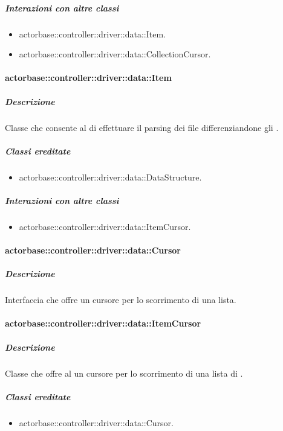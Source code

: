 \documentclass{scalatekids-article}
\begin{document}
\subparagraph{Interazioni con altre classi}

\begin{itemize}
\item actorbase::controller::driver::data::Item.
\item actorbase::controller::driver::data::CollectionCursor.
\end{itemize}

\paragraph{actorbase::controller::driver::data::Item}

\subparagraph{Descrizione}

Classe che consente al  di effettuare il parsing dei file
 differenziandone gli .

\subparagraph{Classi ereditate}

\begin{itemize}
\item actorbase::controller::driver::data::DataStructure.
\end{itemize}

\subparagraph{Interazioni con altre classi}

\begin{itemize}
\item actorbase::controller::driver::data::ItemCursor.
\end{itemize}

\paragraph{actorbase::controller::driver::data::Cursor}

\subparagraph{Descrizione}

Interfaccia che offre un cursore per lo scorrimento di una lista.

\paragraph{actorbase::controller::driver::data::ItemCursor}

\subparagraph{Descrizione}

Classe che offre al  un cursore per lo scorrimento di una lista
di .

\subparagraph{Classi ereditate}

\begin{itemize}
\item actorbase::controller::driver::data::Cursor.
\end{itemize}
\end{document}
